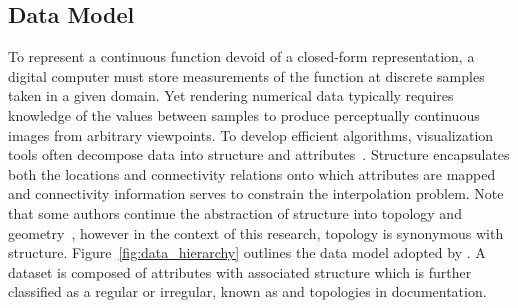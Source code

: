 \subsection{Data Model}
To represent a continuous function devoid of a closed-form
representation, a digital computer must store measurements of the
function at discrete samples taken in a given domain. Yet
rendering numerical data typically requires knowledge of the values
between samples to produce perceptually continuous images from
arbitrary viewpoints. To develop efficient algorithms, visualization
tools often decompose data into structure and
attributes~\cite{vtk}. Structure encapsulates both the locations and
connectivity relations onto which attributes are mapped and
connectivity information serves to constrain the interpolation
problem. Note that some authors continue the abstraction of structure
into topology and geometry~\cite{weiler}, however in the context of
this research, topology is synonymous with
structure. Figure~\ref{fig:data_hierarchy} outlines the data model
adopted by \sciwms{}. A dataset is composed of attributes with
associated structure which is further classified as a regular or
irregular, known as {\bf \cgrid{} } and {\bf \ugrid{}} topologies in
\sciwms{} documentation.
